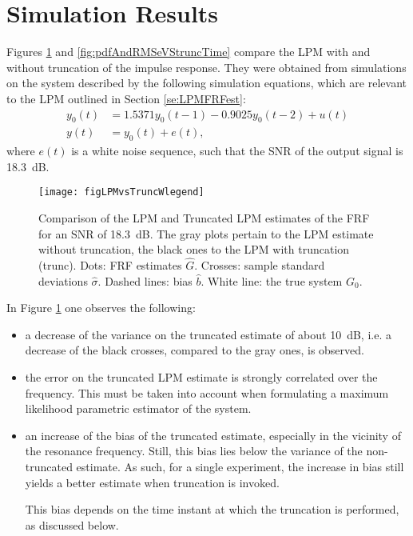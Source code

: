 

\section{Simulation Results}\label{se:simResults}

Figures \ref{figLPMvsTrunc} and \ref{fig:pdfAndRMSeVStruncTime} compare the LPM with and without truncation of the impulse response. They were obtained from simulations on 
the system described by the following simulation equations, which are relevant to the LPM outlined in Section \ref{se:LPMFRFest}:
\begin{subequations}
\label{eq:systemSimulations}
\begin{align}
y_0(t)  &= 1.5371y_0(t-1)    -0.9025y_0(t-2) + u(t)
\\
y(t) &= y_0(t) + e(t),
\end{align}
\end{subequations}
where $e(t)$ is a white noise sequence, such that the SNR of the output signal is 18.3~dB.

\begin{figure}[tbh] %
\centering

\texttt{[image: figLPMvsTruncWlegend]}

\caption{Comparison of the LPM and Truncated LPM estimates of the FRF for an SNR of 18.3~dB. The gray plots pertain to the LPM estimate without truncation, the black ones to the LPM with truncation (trunc). Dots: FRF estimates $\hat{G}$. Crosses: sample standard deviations $\hat{\sigma}$. Dashed lines: bias $\hat{b}$. White line: the true system $G_0$.}
\label{figLPMvsTrunc}
\end{figure}

In Figure \ref{figLPMvsTrunc} one observes the following:
\begin{itemize}
\item
a decrease of the variance on the truncated estimate of about 10~dB,  i.e. a decrease of the black crosses, compared to the gray ones, is observed. %

\item 
the error on the truncated LPM estimate is strongly correlated over the frequency. This must be taken into account when formulating a maximum likelihood parametric estimator of the system.	

\item
an increase of the bias of the truncated estimate, especially in the vicinity of the resonance frequency. Still, this bias lies below the variance of the non-truncated estimate. As such, for a single experiment, the increase in bias still yields a better estimate when truncation is invoked. %

This bias depends on the time instant at which the truncation is performed, as discussed below.

\end{itemize}

